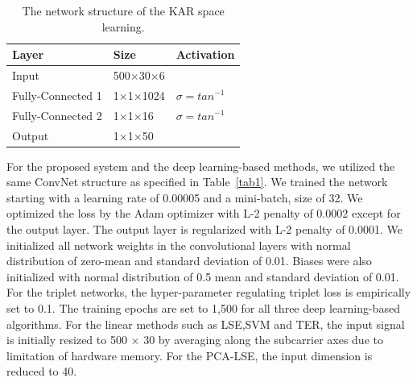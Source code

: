 \documentclass[runningheads]{llncs}
\begin{document}
\begin{table}[]
    \caption{The network structure of the KAR space learning.}\label{tab2}
    \centering
    \begin{tabular}{|l|l|l|}
    \hline
    Layer   & Size     & Activation \\ \hline
    Input   & 500$\times$30$\times$6 &            \\
    Fully-Connected 1 & 1$\times$1$\times$1024 & $\sigma = {tan}^{-1}$     \\
    Fully-Connected 2 & 1$\times$1$\times$16  & $\sigma = {tan}^{-1}$     \\
    Output  & 1$\times$1$\times$50   &            \\ \hline
    \end{tabular}
\end{table}

For the proposed system and the deep learning-based methods, we utilized the same ConvNet structure as specified in Table~\ref{tab1}. We trained the network starting with a learning rate of 0.00005 and a mini-batch, size of 32. We optimized the loss by the Adam optimizer with L-2 penalty of 0.0002 except for the output layer. The output layer is regularized with L-2 penalty of 0.0001. We initialized all network weights in the convolutional layers with normal distribution of zero-mean and standard deviation of 0.01. Biases were also initialized with normal distribution of 0.5 mean and standard deviation of 0.01. For the triplet networks, the hyper-parameter regulating triplet loss is empirically set to 0.1. The training epochs are set to 1,500 for all three deep learning-based algorithms. For the linear methods such as LSE,SVM and TER, the input signal is initially resized to 500 $\times$ 30 by averaging along the subcarrier axes due to limitation of hardware memory. For the PCA-LSE, the input dimension is reduced to 40.
 
\end{document}
